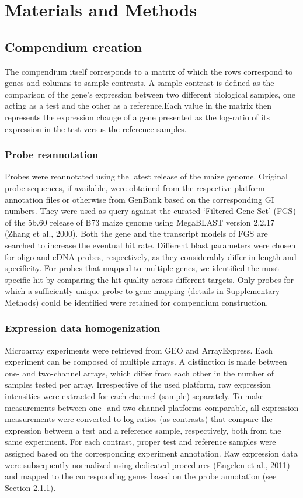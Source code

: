 \section{Materials and Methods}

\subsection{Compendium creation}

The compendium itself corresponds to a matrix of which the rows correspond 
to genes and columns to sample contrasts. A sample contrast is
defined as the comparison of the gene’s expression between two different
biological samples, one acting as a test and the other as a reference.Each
value in the matrix then represents the expression change of a gene presented 
as the log-ratio of its expression in the test versus the reference
samples.

\subsubsection{Probe reannotation} Probes were reannotated using the latest
release of the maize genome. Original probe sequences, if available, were
obtained from the respective platform annotation files or otherwise from
GenBank based on the corresponding GI numbers. They were used as
query against the curated ‘Filtered Gene Set’ (FGS) of the 5b.60 release
of B73 maize genome using MegaBLAST version 2.2.17 (Zhang et al.,
2000). Both the gene and the transcript models of FGS are searched to
increase the eventual hit rate. Different blast parameters were chosen for
oligo and cDNA probes, respectively, as they considerably differ in length
and specificity. For probes that mapped to multiple genes, we identified
the most specific hit by comparing the hit quality across different targets.
Only probes for which a sufficiently unique probe-to-gene mapping (details 
in Supplementary Methods) 
could be identified were retained for
compendium construction.

\subsubsection{Expression data homogenization}

Microarray experiments were retrieved from GEO and ArrayExpress. Each experiment can be
composed of multiple arrays. A distinction is made between one- and
two-channel arrays, which differ from each other in the number of samples 
tested per array. Irrespective of the used platform, raw expression
intensities were extracted for each channel (sample) separately. To make
measurements between one- and two-channel platforms comparable, all
expression measurements were converted to log ratios (as contrasts) that
compare the expression between a test and a reference sample, respectively, 
both from the same experiment. For each contrast, proper test and
reference samples were assigned based on the corresponding experiment
annotation. Raw expression data were subsequently normalized using
dedicated procedures (Engelen et al., 2011) and mapped to the corresponding 
genes based on the probe annotation (see Section 2.1.1).


